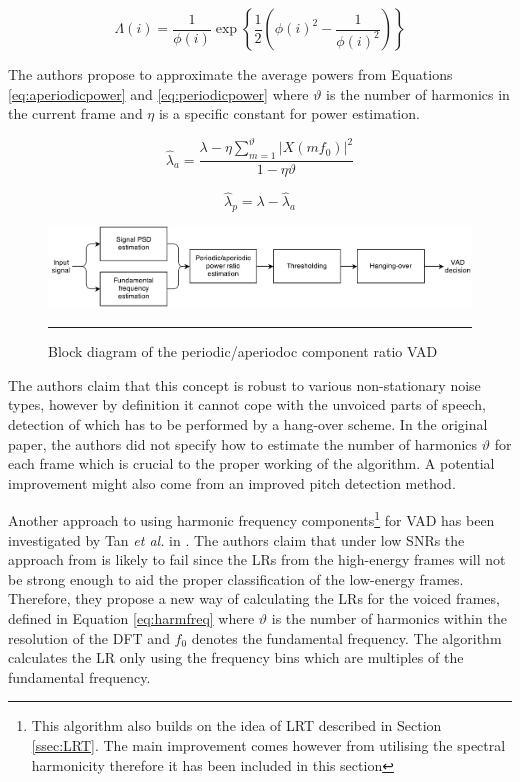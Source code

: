 \begin{equation}
\Lambda(i) = \frac{1}{\phi (i)} \exp \left\{ \frac{1}{2} \left( \phi (i)^{2} - \frac{1}{\phi (i)^{2}} \right) \right\}
\label{eq:PARADE}
\end{equation}

The authors propose to approximate the average powers from Equations \ref{eq:aperiodicpower} and \ref{eq:periodicpower} where $\vartheta$ is the number of harmonics in the current frame and $\eta$ is a specific constant for power estimation.

\begin{equation}
\hat{\lambda}_a = \frac{\lambda - \eta \sum_{m=1}^{\vartheta} \left| X(m f_0) \right|^{2}}{1-\eta \vartheta}
\label{eq:aperiodicpower}
\end{equation}

\begin{equation}
\hat{\lambda}_p = \lambda - \hat{\lambda}_a
\label{eq:periodicpower}
\end{equation}

\begin{figure}[htbp]
	\centering
		\includegraphics[width=0.9\columnwidth]{Figures/Chapter2/PARADE.png}
		\rule{37em}{0.5pt}
	\caption[Block diagram of the periodic/aperiodoc component ratio VAD]{Block diagram of the periodic/aperiodoc component ratio VAD \cite{PARADE}}
	\label{fig:PARADE}
\end{figure}

The authors claim that this concept is robust to various non-stationary noise types, however by definition it cannot cope with the unvoiced parts of speech, detection of which has to be performed by a hang-over scheme. In the original paper, the authors did not specify how to estimate the number of harmonics $\vartheta$ for each frame which is crucial to the proper working of the algorithm. A potential improvement might also come from an improved pitch detection method.

Another approach to using harmonic frequency components\footnote{This algorithm also builds on the idea of LRT described in Section \ref{ssec:LRT}. The main improvement comes however from utilising the spectral harmonicity therefore it has been included in this section} for VAD has been investigated by Tan \emph{et al.} in \cite{Tan}. The authors claim that under low SNRs the approach from \cite{RamirezMulti} is likely to fail since the LRs from the high-energy frames will not be strong enough to aid the proper classification of the low-energy frames. Therefore, they propose a new way of calculating the LRs for the voiced frames, defined in Equation \ref{eq:harmfreq} where $\vartheta$ is the number of harmonics within the resolution of the DFT and $f_0$ denotes the fundamental frequency. The algorithm calculates the LR only using the frequency bins which are multiples of the fundamental frequency.

